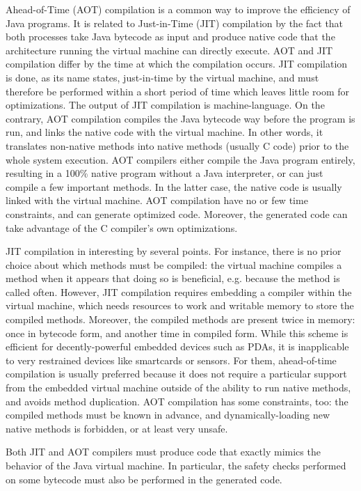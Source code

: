 Ahead-of-Time (AOT) compilation is a common way to improve the efficiency of Java programs. It is related to Just-in-Time (JIT) compilation by the fact that both processes take Java bytecode as input and produce native code that the architecture running the virtual machine can directly execute. AOT and JIT compilation differ by the time at which the compilation occurs. JIT compilation is done, as its name states, just-in-time by the virtual machine, and must therefore be performed within a short period of time which leaves little room for optimizations. The output of JIT compilation is machine-language. On the contrary, AOT compilation compiles the Java bytecode way before the program is run, and links the native code with the virtual machine. In other words, it translates non-native methods into native methods (usually C code) prior to the whole system execution. AOT compilers either compile the Java program entirely, resulting in a 100\% native program without a Java interpreter, or can just compile a few important methods. In the latter case, the native code is usually linked with the virtual machine. AOT compilation have no or few time constraints, and can generate optimized code. Moreover, the generated code can take advantage of the C compiler's own optimizations.

JIT compilation in interesting by several points. For instance, there is no prior choice about which methods must be compiled: the virtual machine compiles a method when it appears that doing so is beneficial, e.g. because the method is called often. However, JIT compilation requires embedding a compiler within the virtual machine, which needs resources to work and writable memory to store the compiled methods. Moreover, the compiled methods are present twice in memory: once in bytecode form, and another time in compiled form. While this scheme is efficient for decently-powerful embedded devices such as PDAs, it is inapplicable to very restrained devices like smartcards or sensors. For them, ahead-of-time compilation is usually preferred because it does not require a particular support from the embedded virtual machine outside of the ability to run native methods, and avoids method duplication. AOT compilation has some constraints, too: the compiled methods must be known in advance, and dynamically-loading new native methods is forbidden, or at least very unsafe.

Both JIT and AOT compilers must produce code that exactly mimics the behavior of the Java virtual machine. In particular, the safety checks performed on some bytecode must also be performed in the generated code.

